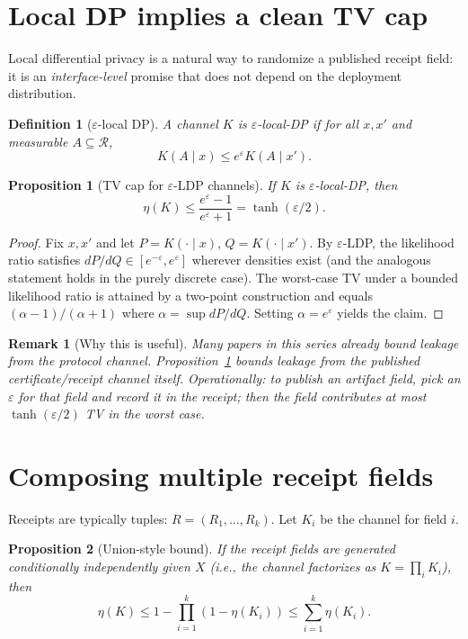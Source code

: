 \documentclass[11pt]{article}
\newtheorem{proposition}{Proposition}
\newtheorem{definition}{Definition}
\newtheorem{remark}{Remark}
\begin{document}
\section{Local DP implies a clean TV cap}
Local differential privacy is a natural way to randomize a published receipt field: it is an \emph{interface-level} promise that does not depend on the deployment distribution.

\begin{definition}[$\varepsilon$-local DP]
A channel $K$ is $\varepsilon$-local-DP if for all $x,x'$ and measurable $A\subseteq\mathcal{R}$,
\[
K(A\mid x) \le e^{\varepsilon} K(A\mid x').
\]
\end{definition}

\begin{proposition}[TV cap for $\varepsilon$-LDP channels]\label{prop:tv-ldp}
If $K$ is $\varepsilon$-local-DP, then
\[
\eta(K)\le \frac{e^{\varepsilon}-1}{e^{\varepsilon}+1}=\tanh(\varepsilon/2).
\]
\end{proposition}

\begin{proof}
Fix $x,x'$ and let $P=K(\cdot\mid x)$, $Q=K(\cdot\mid x')$.
By $\varepsilon$-LDP, the likelihood ratio satisfies $dP/dQ \in [e^{-\varepsilon},e^{\varepsilon}]$ wherever densities exist (and the analogous statement holds in the purely discrete case).
The worst-case TV under a bounded likelihood ratio is attained by a two-point construction and equals $(\alpha-1)/(\alpha+1)$ where $\alpha=\sup dP/dQ$.
Setting $\alpha=e^{\varepsilon}$ yields the claim.
\end{proof}

\begin{remark}[Why this is useful]
Many papers in this series already bound leakage from the \emph{protocol} channel.
Proposition~\ref{prop:tv-ldp} bounds leakage from the \emph{published certificate/receipt} channel itself.
Operationally: to publish an artifact field, pick an $\varepsilon$ for that field and record it in the receipt; then the field contributes at most $\tanh(\varepsilon/2)$ TV in the worst case.
\end{remark}

\section{Composing multiple receipt fields}
Receipts are typically tuples: $R=(R_1,\dots,R_k)$.
Let $K_i$ be the channel for field $i$.

\begin{proposition}[Union-style bound]\label{prop:union}
If the receipt fields are generated conditionally independently given $X$ (i.e., the channel factorizes as $K=\prod_i K_i$), then
\[
\eta(K) \le 1-\prod_{i=1}^k (1-\eta(K_i)) \le \sum_{i=1}^k \eta(K_i).
\]
\end{proposition}
\end{document}
